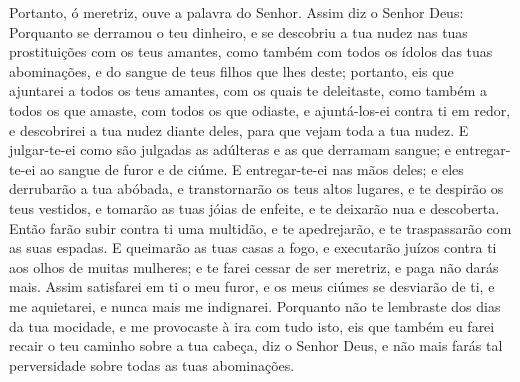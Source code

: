 Portanto, ó meretriz, ouve a palavra do Senhor. Assim diz
o Senhor Deus: Porquanto se derramou o teu dinheiro, e se descobriu
a tua nudez nas tuas prostituições com os teus amantes, como também
com todos os ídolos das tuas abominações, e do sangue de teus filhos
que lhes deste; portanto, eis que ajuntarei a todos os teus
amantes, com os quais te deleitaste, como também a todos os que
amaste, com todos os que odiaste, e ajuntá-los-ei contra ti em
redor, e descobrirei a tua nudez diante deles, para que vejam toda a
tua nudez. E julgar-te-ei como são julgadas as adúlteras e as
que derramam sangue; e entregar-te-ei ao sangue de furor e de ciúme.
E entregar-te-ei nas mãos deles; e eles derrubarão a tua
abóbada, e transtornarão os teus altos lugares, e te despirão os
teus vestidos, e tomarão as tuas jóias de enfeite, e te deixarão nua
e descoberta. Então farão subir contra ti uma multidão, e te
apedrejarão, e te traspassarão com as suas espadas. E
queimarão as tuas casas a fogo, e executarão juízos contra ti aos
olhos de muitas mulheres; e te farei cessar de ser meretriz, e paga
não darás mais. Assim satisfarei em ti o meu furor, e os meus
ciúmes se desviarão de ti, e me aquietarei, e nunca mais me
indignarei. Porquanto não te lembraste dos dias da tua
mocidade, e me provocaste à ira com tudo isto, eis que também eu
farei recair o teu caminho sobre a tua cabeça, diz o Senhor Deus, e
não mais farás tal perversidade sobre todas as tuas abominações.

